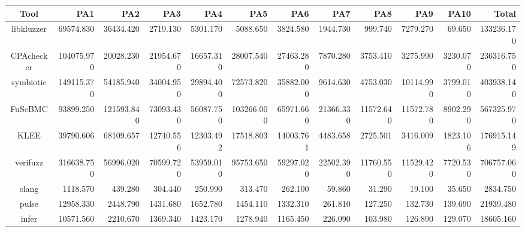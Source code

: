 \begin{table}
	\begin{center}
		\begin{tabular}{|c|r|r|r|r|r|r|r|r|r|r|r|}
			\hline
			Tool & PA1 & PA2 & PA3 & PA4 & PA5 & PA6 & PA7 & PA8 & PA9 & PA10 & Total \\
			\hline
			libkluzzer & 69574.830 & 36434.420 & 2719.130 & 5301.170 & 5088.650 & 3824.580 & 1944.730 & 999.740 & 7279.270 & 69.650 & 133236.170 \\
			\hline
			CPAchecker & 104075.970 & 20028.230 & 21954.670 & 16657.310 & 28007.540 & 27463.280 & 7870.280 & 3753.410 & 3275.990 & 3230.070 & 236316.750 \\
			\hline
			symbiotic & 149115.370 & 54185.940 & 34004.950 & 29894.400 & 72573.820 & 35882.000 & 9614.630 & 4753.030 & 10114.990 & 3799.010 & 403938.140 \\
			\hline
			FuSeBMC & 93899.250 & 121593.840 & 73093.430 & 56087.750 & 103266.000 & 65971.660 & 21366.330 & 11572.640 & 11572.780 & 8902.290 & 567325.970 \\
			\hline
			KLEE & 39790.606 & 68109.657 & 12740.556 & 12303.492 & 17518.803 & 14003.761 & 4483.658 & 2725.501 & 3416.009 & 1823.106 & 176915.149 \\
			\hline
			verifuzz & 316638.750 & 56996.020 & 70599.720 & 53959.010 & 95753.650 & 59297.020 & 22502.390 & 11760.550 & 11529.420 & 7720.530 & 706757.060 \\
			\hline
			clang & 1118.570 & 439.280 & 304.440 & 250.990 & 313.470 & 262.100 & 59.860 & 31.290 & 19.100 & 35.650 & 2834.750 \\
			\hline
			pulse & 12958.330 & 2448.790 & 1431.680 & 1652.780 & 1454.110 & 1332.310 & 261.810 & 127.250 & 132.730 & 139.690 & 21939.480 \\
			\hline
			infer & 10571.560 & 2210.670 & 1369.340 & 1423.170 & 1278.940 & 1165.450 & 226.090 & 103.980 & 126.890 & 129.070 & 18605.160 \\
			\hline
		\end{tabular}
	\end{center}
\end{table}